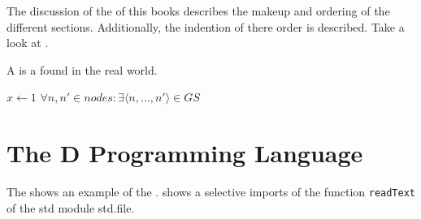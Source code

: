 \documentclass[crop=false,class=scrbook]{standalone}
\begin{document}
The discussion of the  of this books describes the makeup and ordering
of the different sections.
Additionally, the indention of there order is described.
Take a look at .

\begin{defn}
	A  is a  found in the real world.
\end{defn}

\begin{algorithm}
\begin{algorithmic}
   \State \(x \leftarrow 1\)
   \Return \(\forall n,n' \in nodes : \exists \langle n, \dots, n' \rangle \in GS\)
\EndProcedure
\end{algorithmic}
\end{algorithm}

\section{The D Programming Language}

The  shows an example of the .
 shows a selective imports of the 
function \texttt{readText} of the std module std.file.
\end{document}
